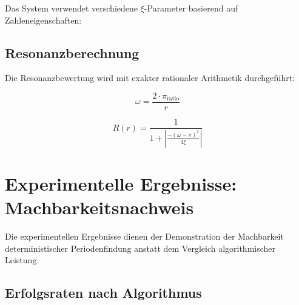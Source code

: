 	Das System verwendet verschiedene $\xi$-Parameter basierend auf Zahleneigenschaften:
	
	\begin{table}[H]
		\centering
		\caption{$\xi$-Strategien im T0-Framework}
		\label{tab:xi_strategies}
	\end{table}
	
	\subsection{Resonanzberechnung}
	
	Die Resonanzbewertung wird mit exakter rationaler Arithmetik durchgeführt:
	
	\begin{equation}
		\omega = \frac{2 \cdot \pi_{\text{ratio}}}{r}
	\end{equation}
	
	\begin{equation}
		R(r) = \frac{1}{1 + \left|\frac{-(\omega-\pi)^2}{4\xi}\right|}
	\end{equation}
	
	\section{Experimentelle Ergebnisse: Machbarkeitsnachweis}
	
	Die experimentellen Ergebnisse dienen der Demonstration der Machbarkeit deterministischer Periodenfindung anstatt dem Vergleich algorithmischer Leistung.
	
	\subsection{Erfolgsraten nach Algorithmus}
	
